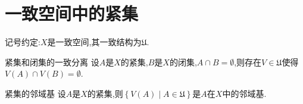 \section{一致空间中的紧集}

记号约定:$X$是一致空间,其一致结构为$\mathfrak{U}$.

\begin{proposition}{紧集和闭集的一致分离}{}
	设$A$是$X$的紧集,$B$是$X$的闭集,$A\cap B=\emptyset$,则存在$V\in\mathfrak{U}$使得$V\left(A\right)\cap V\left(B\right)=\emptyset$.
\end{proposition}

\begin{corollary}{紧集的邻域基}{}
	设$A$是$X$的紧集,则$\left\{V\left(A\right)\middle|A\in\mathfrak{U}\right\}$是$A$在$X$中的邻域基.
\end{corollary}

